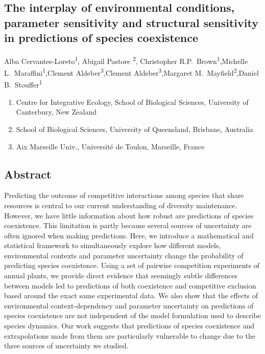 \begin{refsection}
\chapter{The interplay of environmental conditions, parameter sensitivity and structural sensitivity in predictions of species coexistence} %
\label{Bayesian_competition}

\noindent Alba Cervantes-Loreto\textsuperscript{1}, Abigail Pastore \textsuperscript{2}, Christopher R.P.\ Brown\textsuperscript{1},Michelle L.\ Maraffini\textsuperscript{1},Clement Aldeber\textsuperscript{3},Clement Aldeber\textsuperscript{3},Margaret M.\ Mayfield\textsuperscript{2},Daniel B.\ Stouffer\textsuperscript{1}

\begin{enumerate}
    \item Centre for Integrative Ecology, School of Biological Sciences, University of Canterbury, New Zealand
    \item School of Biological Sciences, University of Queensland, Brisbane, Australia
    \item Aix Marseille Univ., Université de Toulon,  Marseille, France
\end{enumerate}

\section*{Abstract}


Predicting the outcome of competitive interactions among species that share resources is central to our current understanding of diversity maintenance. However, we have little information about how robust are predictions of species coexistence. This limitation is partly because several sources of uncertainty are often ignored when making predictions. Here, we introduce a mathematical and statistical framework to simultaneously explore how different models, environmental contexts and parameter uncertainty change the probability of predicting species coexistence.  Using a set of pairwise competition experiments of annual plants, we provide direct evidence that seemingly subtle differences between models led to predictions of both coexistence and competitive exclusion based around the exact same experimental data. We also show that the effects of environmental context-dependency and parameter uncertainty on predictions of species coexistence are not independent of the model formulation used to describe species dynamics. Our work suggests that predictions of species coexistence and extrapolations made from them are particularly vulnerable to change due to the three sources of uncertainty we studied.


\end{refsection}
